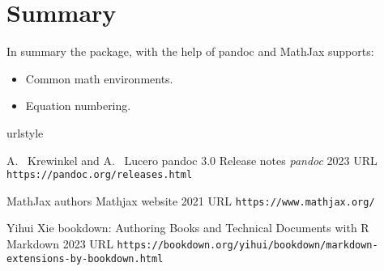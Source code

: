 \section{Summary}

In summary the  package, with the help of pandoc and MathJax supports:
\begin{itemize}
\item Common math environments.
\item Equation numbering.
\end{itemize}


\begin{thebibliography}{2}
    \providecommand{\natexlab}[1]{#1}
    \providecommand{\url}[1]{\texttt{#1}}
    \expandafter\ifx\csname urlstyle\endcsname\relax
      \providecommand{\doi}[1]{doi: #1}\else
      \providecommand{\doi}{doi: \begingroup \urlstyle{rm}\Url}\fi

A.~ Krewinkel and A.~ Lucero
\newblock pandoc 3.0 Release notes
\newblock \emph{pandoc}  2023
\newblock URL \url{https://pandoc.org/releases.html}

MathJax authors
\newblock Mathjax website
\newblock  {} 2021
\newblock URL \url{https://www.mathjax.org/}

Yihui Xie
\newblock bookdown: Authoring Books and Technical Documents with R Markdown
\newblock {} 2023
\newblock URL \url{https://bookdown.org/yihui/bookdown/markdown-extensions-by-bookdown.html}

\end{thebibliography}


\address{%
Abhishek Ulayil\\
Student, Institute of Actuaries of India\\%
Mumbai, India\\
ORCiD: 0009-0000-6935-8690\\
}
